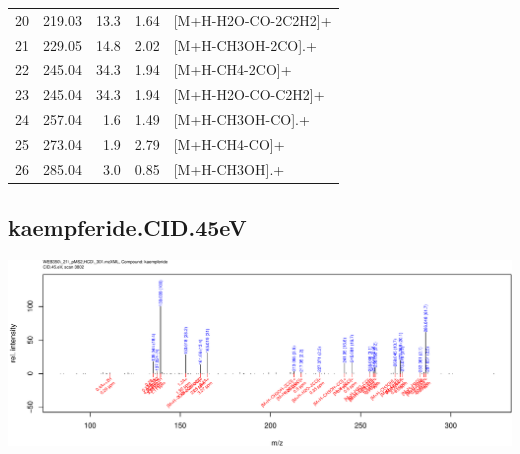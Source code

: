 \documentclass[]{article}
\begin{document}
\begin{table}[ht]
\begin{tabular}{rrrrl}
  20 & 219.03 & 13.3 & 1.64 & [M+H-H2O-CO-2C2H2]+ \\ 
  21 & 229.05 & 14.8 & 2.02 & [M+H-CH3OH-2CO].+ \\ 
  22 & 245.04 & 34.3 & 1.94 & [M+H-CH4-2CO]+ \\ 
  23 & 245.04 & 34.3 & 1.94 & [M+H-H2O-CO-C2H2]+ \\ 
  24 & 257.04 & 1.6 & 1.49 & [M+H-CH3OH-CO].+ \\ 
  25 & 273.04 & 1.9 & 2.79 & [M+H-CH4-CO]+ \\ 
  26 & 285.04 & 3.0 & 0.85 & [M+H-CH3OH].+ \\ 
   \bottomrule
\end{tabular}
\end{table}

\clearpage\subsection{kaempferide.CID.45eV}
\includegraphics[width=\textwidth]{WEB350_files/figure-latex/unnamed-chunk-3-43}
\end{document}
